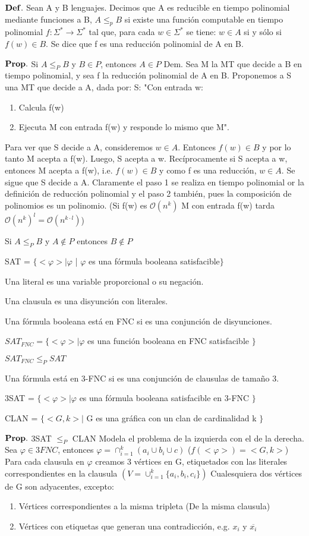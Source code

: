 \documentclass{homework}
\begin{document}
$\bf{Def.}$ Sean A y B lenguajes. Decimos que A es reducible en tiempo polinomial mediante funciones a B, $A \leq_p B$ si existe una función computable en tiempo polinomial $f: \Sigma^* \rightarrow \Sigma^*$ tal que, para cada $w \in \Sigma^*$ se tiene: $w \in A$ si y sólo si $f(w) \in B$.
Se dice que f es una reducción polinomial de A en B.

$\bf{Prop.}$ Si $A \leq_P B$ y $B \in P$, entonces $A \in P$
Dem. Sea M la MT que decide a B en tiempo polinomial, y sea f la reducción polinomial de A en B. Proponemos a S una MT que decide a A, dada por:
S: "Con entrada w:
\begin{enumerate}
	\item Calcula f(w)
	\item  Ejecuta M con entrada f(w) y responde lo mismo que M".
\end{enumerate}

Para ver que S decide a A, consideremos $w \in A$. Entonces $f(w) \in B$ y por lo tanto M acepta a f(w). Luego, S acepta a w. Recíprocamente si S acepta a w, entonces M acepta a f(w), i.e. $f(w) \in B$ y como f es una reducción, $w \in A$. Se sigue que S decide a A. Claramente el paso 1 se realiza en tiempo polinomial or la definición de reducción polinomial y el paso 2 también, pues la composición de polinomios es un polinomio.
(Si f(w) es $\mathcal{O}(n^k)$ M  con entrada f(w) tarda $\mathcal{O}(n^k)^l =  \mathcal{O}(n^{k \cdot l})$)

Si $A \leq_P B$ y $A \notin P$ entonces $B \notin P$

SAT = $\{<\varphi> | \varphi$ | $\varphi$ es una fórmula booleana satisfacible$\}$

Una literal es una variable proporcional o su negación.

Una clausula es una disyunción con literales.

Una fórmula booleana está en FNC si es una conjunción de disyunciones.

$SAT_{FNC} = \{ <\varphi>| \varphi$ es una función booleana en FNC satisfacible $\}$

$SAT_{FNC} \leq_P SAT$

Una fórmula está en 3-FNC si es una conjunción de clausulas de tamaño 3.

3SAT = $\{<\varphi> | \varphi$ es una fórmula booleana satisfacible en 3-FNC $\}$

CLAN = $\{<G,k>|$ G es una gráfica con un clan de cardinalidad k  $\}$

$\bf{Prop.}$ 3SAT $\leq_P$ CLAN
Modela el problema de la izquierda con el de la derecha. Sea $\varphi \in 3FNC$, entonces $\varphi = \cap_{i=1}^{k} (a_i \cup b_i \cup c)$  ($f(<\varphi>) = <G,k>$) 
Para cada clausula en $\varphi$ creamos 3 vértices en G, etiquetados con las literales correspondientes en la clausula $(V = \cup_{i=1}^{k}\{a_i,b_i,c_i\})$ 
Cualesquiera dos vértices de G son adyacentes, excepto:
\begin{enumerate}
	\item Vértices correspondientes a la misma tripleta (De la misma clausula)
	\item Vértices con etiquetas que generan una contradicción, e.g. $x_i$ y $\overline{x_i}$
\end{enumerate}
\end{document}
